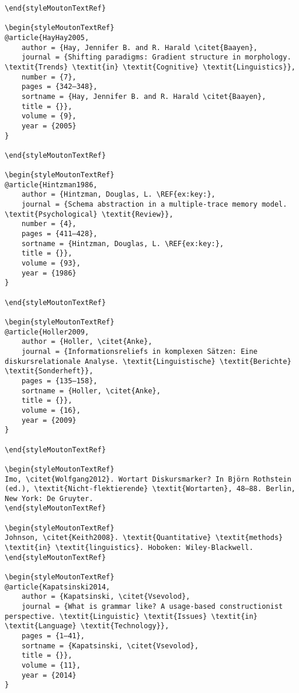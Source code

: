 \begin{styleMoutonHeadingRef}
\begin{verbatim}
\end{styleMoutonTextRef}

\begin{styleMoutonTextRef}
@article{HayHay2005,
	author = {Hay, Jennifer B. and R. Harald \citet{Baayen},
	journal = {Shifting paradigms: Gradient structure in morphology. \textit{Trends} \textit{in} \textit{Cognitive} \textit{Linguistics}},
	number = {7},
	pages = {342–348},
	sortname = {Hay, Jennifer B. and R. Harald \citet{Baayen},
	title = {}},
	volume = {9},
	year = {2005}
}

\end{styleMoutonTextRef}

\begin{styleMoutonTextRef}
@article{Hintzman1986,
	author = {Hintzman, Douglas, L. \REF{ex:key:},
	journal = {Schema abstraction in a multiple-trace memory model. \textit{Psychological} \textit{Review}},
	number = {4},
	pages = {411–428},
	sortname = {Hintzman, Douglas, L. \REF{ex:key:},
	title = {}},
	volume = {93},
	year = {1986}
}

\end{styleMoutonTextRef}

\begin{styleMoutonTextRef}
@article{Holler2009,
	author = {Holler, \citet{Anke},
	journal = {Informationsreliefs in komplexen Sätzen: Eine diskursrelationale Analyse. \textit{Linguistische} \textit{Berichte} \textit{Sonderheft}},
	pages = {135–158},
	sortname = {Holler, \citet{Anke},
	title = {}},
	volume = {16},
	year = {2009}
}

\end{styleMoutonTextRef}

\begin{styleMoutonTextRef}
Imo, \citet{Wolfgang2012}. Wortart Diskursmarker? In Björn Rothstein (ed.), \textit{Nicht-flektierende} \textit{Wortarten}, 48–88. Berlin, New York: De Gruyter.
\end{styleMoutonTextRef}

\begin{styleMoutonTextRef}
Johnson, \citet{Keith2008}. \textit{Quantitative} \textit{methods} \textit{in} \textit{linguistics}. Hoboken: Wiley-Blackwell.
\end{styleMoutonTextRef}

\begin{styleMoutonTextRef}
@article{Kapatsinski2014,
	author = {Kapatsinski, \citet{Vsevolod},
	journal = {What is grammar like? A usage-based constructionist perspective. \textit{Linguistic} \textit{Issues} \textit{in} \textit{Language} \textit{Technology}},
	pages = {1–41},
	sortname = {Kapatsinski, \citet{Vsevolod},
	title = {}},
	volume = {11},
	year = {2014}
}


\end{verbatim}
\end{styleMoutonHeadingRef}
